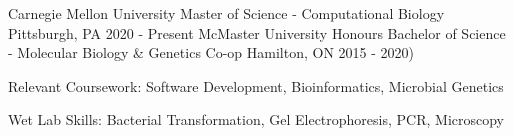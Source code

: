 \begin{cventries}
   \cventry
       {Carnegie Mellon University}
       {Master of Science - Computational Biology}
       {Pittsburgh, PA} %
       {2020 - Present}
       {}
   \cventry
       {McMaster University}
       {Honours Bachelor of Science - Molecular Biology \& Genetics Co-op}
       {Hamilton, ON} %
       {2015 - 2020)}
       {
         \begin{cvitems}
          \item{Relevant Coursework: Software Development, Bioinformatics, Microbial Genetics}
          \item{Wet Lab Skills: Bacterial Transformation, Gel Electrophoresis, PCR, Microscopy}
        \end{cvitems}
       }
\end{cventries}
